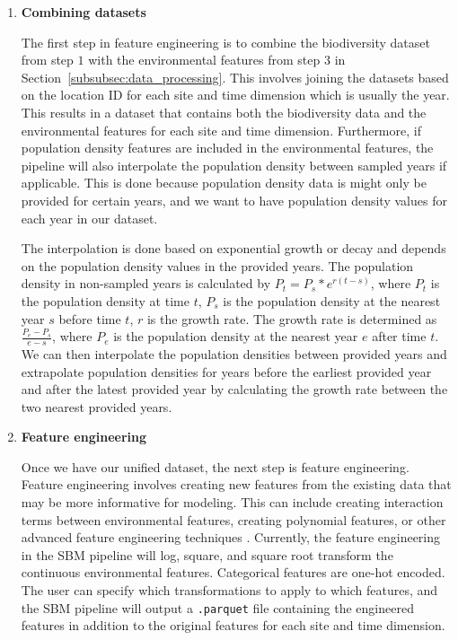 \begin{enumerate}
\item \textbf{Combining datasets}

The first step in feature engineering is to combine the biodiversity dataset from step \(1\) with the environmental features from step \(3\) in Section~\ref{subsubsec:data_processing}. This involves joining the datasets based on the location ID for each site and time dimension which is usually the year. This results in a dataset that contains both the biodiversity data and the environmental features for each site and time dimension. Furthermore, if population density features are included in the environmental features, the pipeline will also interpolate the population density between sampled years if applicable. This is done because population density data is might only be provided for certain years, and we want to have population density values for each year in our dataset. 

The interpolation is done based on exponential growth or decay and depends on the population density values in the provided years. The population density in non-sampled years is calculated by \(P_t = P_s * e^{r(t-s)}\), where \(P_t\) is the population density at time \(t\), \(P_s\) is the population density at the nearest year \(s\) before time \(t\), \(r\) is the growth rate. The growth rate is determined as \(\frac{P_e - P_s}{e-s}\), where \(P_e\) is the population density at the nearest year \(e\) after time \(t\). We can then interpolate the population densities between provided years and extrapolate population densities for years before the earliest provided year and after the latest provided year by calculating the growth rate between the two nearest provided years. 

\item \textbf{Feature engineering}

Once we have our unified dataset, the next step is feature engineering. Feature engineering involves creating new features from the existing data that may be more informative for modeling. This can include creating interaction terms between environmental features, creating polynomial features, or other advanced feature engineering techniques \parencite{Katya2023}. Currently, the feature engineering in the SBM pipeline will log, square, and square root transform the continuous environmental features. Categorical features are one-hot encoded. The user can specify which transformations to apply to which features, and the SBM pipeline will output a \texttt{.parquet} file containing the engineered features in addition to the original features for each site and time dimension.


\end{enumerate}
